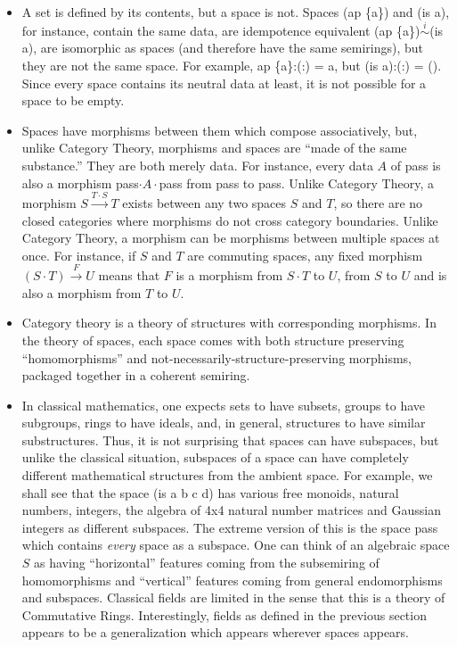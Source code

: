 \documentclass[11pt]{article}
\begin{document}
\begin{itemize}
\item{A set is defined by its contents, but a space is not.  Spaces (ap \{a\}) and (is a), for instance, contain the 
same data, are idempotence equivalent (ap \{a\})${\overset i\sim}$(is a), are isomorphic as spaces (and therefore have 
the same semirings), but they are not the same space.  For example, ap \{a\}:(:) = a, but (is a):(:) = ().  Since every 
space contains its neutral data at least, it is not possible for a space to be empty.}
\item{Spaces have morphisms between them which compose associatively, but, unlike Category Theory, morphisms 
and spaces are ``made of the same substance.'' They are both merely data.  For instance, every data $A$ of pass is also 
a morphism pass$\cdot A\cdot$pass from pass to pass.  Unlike Category Theory, a morphism 
$S{\overset {T\cdot S}\longrightarrow}T$ exists between any two spaces $S$ and $T$, so there are no closed categories 
where morphisms do not cross category boundaries.  Unlike Category Theory, a morphism can be morphisms between 
multiple spaces at once.  For instance, if $S$ and $T$ are commuting spaces, any fixed morphism $(S\cdot T){\overset F\rightarrow} U$ 
means that $F$ is a morphism from $S\cdot T$ to $U$, from $S$ to $U$ and is also a morphism from $T$ to $U$.}
\item{Category theory is a theory of structures with corresponding morphisms.  In the theory of spaces, each space 
comes with both structure preserving ``homomorphisms'' and not-necessarily-structure-preserving morphisms, packaged together 
in a coherent semiring.} 
\item{In classical mathematics, one expects sets to have subsets, groups to have subgroups, rings to have ideals, and, in general, 
structures to have similar substructures.  Thus, it is not surprising that spaces can have subspaces, but unlike the classical situation, 
subspaces of a space can have completely different mathematical structures from the ambient space.  For example, we shall see that 
the space (is a b c d) has various free monoids, natural numbers, integers, the algebra of 4x4 natural number matrices and 
Gaussian integers as different subspaces.  The extreme version of this is the space pass which contains {\it every} space as a subspace.  One can think of 
an algebraic space $S$ as having ``horizontal'' features coming from the subsemiring of homomorphisms and ``vertical'' features 
coming from general endomorphisms and subspaces.  Classical fields are limited in the sense that this is a theory of Commutative Rings.  Interestingly, 
fields as defined in the previous section appears to be a generalization which appears wherever spaces appears.} 
\end{itemize}
\end{document}
